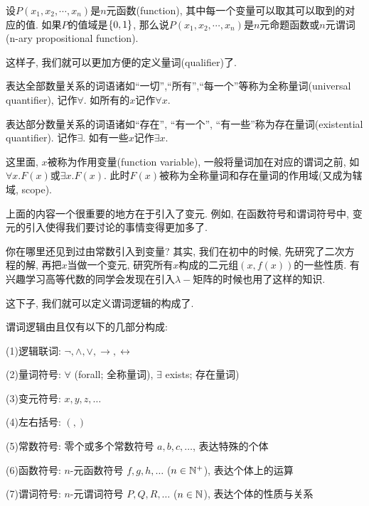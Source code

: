 \begin{definition}[$n$元命题函数]
	设$P(x_1,x_2,\cdots,x_n)$是$n$元函数(function), 其中每一个变量可以取其可以取到的对应的值. 如果$P$的值域是$\{0,1\}$, 那么说$P(x_1 ,x_2, \cdots, x_n)$是$n$元命题函数或$n$元谓词(n-ary propositional function).  
\end{definition}

这样子, 我们就可以更加方便的定义量词(qualifier)了. 

\begin{definition}[全称量词与特称量词]
	表达全部数量关系的词语诸如``一切'',``所有'',``每一个''等称为全称量词(universal quantifier), 记作$\forall$. 如所有的$x$记作$\forall x$. 
	
	表达部分数量关系的词语诸如``存在'', ``有一个'', ``有一些''称为存在量词(existential quantifier). 记作$\exists$. 如有一些$x$记作$\exists x$. 
	
	这里面, $x$被称为作用变量(function variable), 一般将量词加在对应的谓词之前, 如$\forall x. F(x)$或$\exists x. F(x)$. 此时$F(x)$被称为全称量词和存在量词的作用域(又成为辖域, scope). 
\end{definition}

上面的内容一个很重要的地方在于引入了变元. 例如, 在函数符号和谓词符号中, 变元的引入使得我们要讨论的事情变得更加多了. 

\begin{bonus}
	你在哪里还见到过由常数引入到变量? 其实, 我们在初中的时候, 先研究了二次方程的解, 再把$x$当做一个变元, 研究所有$x$构成的二元组$(x,f(x))$的一些性质. 有兴趣学习高等代数的同学会发现在引入$\lambda-\text{矩阵}$的时候也用了这样的知识. 
\end{bonus}

这下子, 我们就可以定义谓词逻辑的构成了. 

\begin{definition}[谓词逻辑的构成] 谓词逻辑由且仅有以下的几部分构成: 

      (1)逻辑联词: $\lnot, \land, \lor, \to, \leftrightarrow$
      
      (2)量词符号:  $\forall$ (forall; 全称量词),
        $\exists$ exists; 存在量词)
      
      (3)变元符号: $x, y, z, \dots$
      
      (4)左右括号: $(, )$
      
      (5)常数符号: 零个或多个常数符号 $a, b, c, \dots$, 表达特殊的个体
      
      (6)函数符号: $n$-元函数符号 $f, g, h, \dots$ ($n \in \mathbb{N}^{+}$), 表达个体上的运算
      
      (7)谓词符号:  $n$-元谓词符号 $P, Q, R, \dots$ ($n \in \mathbb{N}$), 表达个体的性质与关系
    
\end{definition}





